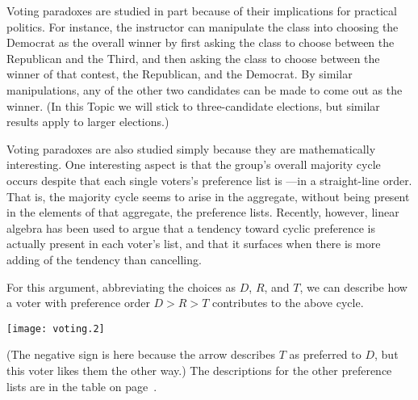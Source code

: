 Voting paradoxes are studied in part because of their 
implications for practical politics.
For instance, the instructor can manipulate the
class into choosing the Democrat as the overall winner 
by first asking the class to choose between the Republican and
the Third, 
and then asking the class to choose between the winner of that contest, the
Republican, and the Democrat.   
By similar manipulations, 
any of the other two candidates can be made to come out as the winner.
(In this Topic we will stick to three-candidate elections, but
similar results apply to larger elections.)

Voting paradoxes are also studied simply because they are
mathematically interesting.
One interesting aspect is that
the group's overall majority cycle occurs despite that  
each single voters's preference list is 
---in 
a straight-line order.
That is, the majority cycle seems to arise in the aggregate, 
without being present in the elements of that aggregate, the preference lists.
Recently, however, linear algebra has been used \cite{Zwicker} to argue that
a tendency toward cyclic preference is actually present
in each voter's list, and
that it surfaces when there is more adding of the tendency
than cancelling.

For this argument,
abbreviating the choices as $D$, $R$, and $T$,
we can describe how
a voter with preference order $D>R>T$ contributes to the above cycle.
\begin{center}
  \texttt{[image: voting.2]}
\end{center}
(The negative sign is here because the arrow describes $T$ as 
preferred to $D$, but this voter likes them the other way.)
The descriptions for the other preference lists are in the table on 
page~\pageref{table:Voting}.

